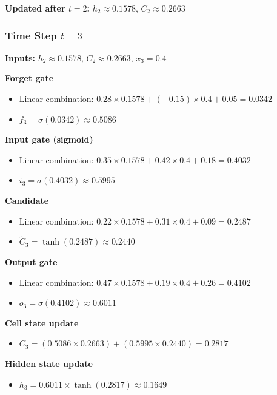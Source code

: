 \documentclass[12pt]{article}
\begin{document}
\textbf{Updated after $t=2$:} $h_2 \approx 0.1578$, $C_2 \approx 0.2663$

\subsubsection*{Time Step $t = 3$}

\textbf{Inputs:} $h_2 \approx 0.1578$, $C_2 \approx 0.2663$, $x_3 = 0.4$

\textcolor{headingRed}{\textbf{Forget gate}}
\begin{itemize}[leftmargin=*]
    \item Linear combination: $0.28 \times 0.1578 + (-0.15) \times 0.4 + 0.05 = 0.0342$
    \item $f_3 = \sigma(0.0342) \approx 0.5086$
\end{itemize}

\textcolor{headingRed}{\textbf{Input gate (sigmoid)}}
\begin{itemize}[leftmargin=*]
    \item Linear combination: $0.35 \times 0.1578 + 0.42 \times 0.4 + 0.18 = 0.4032$
    \item $i_3 = \sigma(0.4032) \approx 0.5995$
\end{itemize}

\textcolor{headingRed}{\textbf{Candidate}}
\begin{itemize}[leftmargin=*]
    \item Linear combination: $0.22 \times 0.1578 + 0.31 \times 0.4 + 0.09 = 0.2487$
    \item $\tilde{C}_3 = \tanh(0.2487) \approx 0.2440$
\end{itemize}

\textcolor{headingRed}{\textbf{Output gate}}
\begin{itemize}[leftmargin=*]
    \item Linear combination: $0.47 \times 0.1578 + 0.19 \times 0.4 + 0.26 = 0.4102$
    \item $o_3 = \sigma(0.4102) \approx 0.6011$
\end{itemize}

\textcolor{headingRed}{\textbf{Cell state update}}
\begin{itemize}[leftmargin=*]
    \item $C_3 = (0.5086 \times 0.2663) + (0.5995 \times 0.2440) = 0.2817$
\end{itemize}

\textcolor{headingRed}{\textbf{Hidden state update}}
\begin{itemize}[leftmargin=*]
    \item $h_3 = 0.6011 \times \tanh(0.2817) \approx 0.1649$
\end{itemize}
\end{document}
